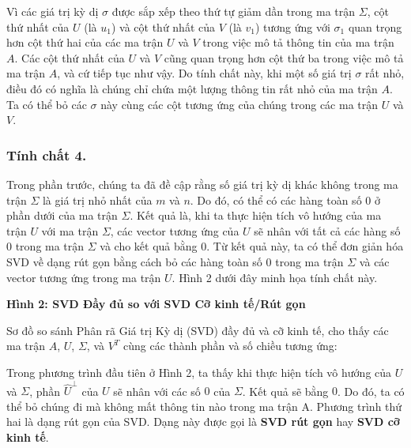 Vì các giá trị kỳ dị $\sigma$ được sắp xếp theo thứ tự giảm dần trong ma trận $\Sigma$, cột thứ nhất của $U$ (là $u_{1}$) và cột thứ nhất của $V$ (là $v_{1}$) tương ứng với $\sigma_{1}$ quan trọng hơn cột thứ hai của các ma trận $U$ và $V$ trong việc mô tả thông tin của ma trận $A$. Các cột thứ nhất của $U$ và $V$ cũng quan trọng hơn cột thứ ba trong việc mô tả ma trận $A$, và cứ tiếp tục như vậy. Do tính chất này, khi một số giá trị $\sigma$ rất nhỏ, điều đó có nghĩa là chúng chỉ chứa một lượng thông tin rất nhỏ của ma trận $A$. Ta có thể bỏ các $\sigma$ này cùng các cột tương ứng của chúng trong các ma trận $U$ và $V$.

\subsubsection*{Tính chất 4.}

Trong phần trước, chúng ta đã đề cập rằng số giá trị kỳ dị khác không trong ma trận $\Sigma$ là giá trị nhỏ nhất của $m$ và $n$. Do đó, có thể có các hàng toàn số $0$ ở phần dưới của ma trận $\Sigma$. Kết quả là, khi ta thực hiện tích vô hướng của ma trận $U$ với ma trận $\Sigma$, các vector tương ứng của $U$ sẽ nhân với tất cả các hàng số $0$ trong ma trận $\Sigma$ và cho kết quả bằng $0$. Từ kết quả này, ta có thể đơn giản hóa SVD về dạng rút gọn bằng cách bỏ các hàng toàn số $0$ trong ma trận $\Sigma$ và các vector tương ứng trong ma trận $U$. Hình 2 dưới đây minh họa tính chất này.

\textbf{Hình 2: SVD Đầy đủ so với SVD Cỡ kinh tế/Rút gọn}

Sơ đồ so sánh Phân rã Giá trị Kỳ dị (SVD) đầy đủ và cỡ kinh tế, cho thấy các ma trận $A$, $U$, $\Sigma$, và $V^T$ cùng các thành phần và số chiều tương ứng:

\begin{figure}[H]
\centering
{}
\end{figure}

Trong phương trình đầu tiên ở Hình 2, ta thấy khi thực hiện tích vô hướng của $U$ và $\Sigma$, phần $\hat{U}^{\bot }$ của $U$ sẽ nhân với các số $0$ của $\Sigma$. Kết quả sẽ bằng $0$. Do đó, ta có thể bỏ chúng đi mà không mất thông tin nào trong ma trận A. Phương trình thứ hai là dạng rút gọn của SVD. Dạng này được gọi là \textbf{SVD rút gọn} hay \textbf{SVD cỡ kinh tế}.

